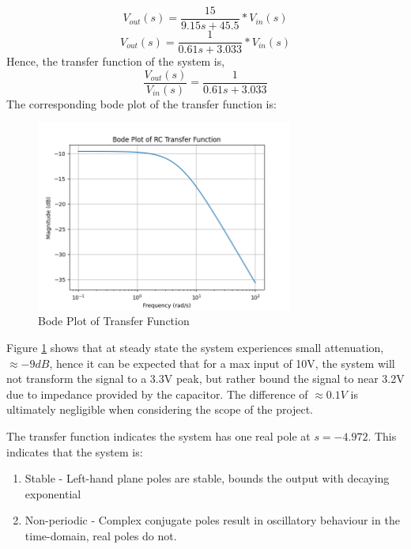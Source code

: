 \documentclass[12pt, a4paper]{article}
\begin{document}
\[V_{out}(s)=\frac{15}{9.15s+45.5}*V_{in}(s)\]
\[V_{out}(s)=\frac{1}{0.61s+3.033}*V_{in}(s)\]
\indent Hence, the transfer function of the system is,
\[\frac{V_{out}(s)}{V_{in}(s)}=\frac{1}{0.61s+3.033}\]
The corresponding bode plot of the transfer function is:
\begin{figure}[H]
    \centering
    \includegraphics[width=0.75\textwidth]{bodeplot}
    \caption{Bode Plot of Transfer Function}
    \label{fig:bode_plot}
\end{figure}
\noindent Figure \ref{fig:bode_plot} shows that at steady state the system experiences small attenuation, $\approx-9dB$,
hence it can be expected that for a max input of 10V, the system will not transform the signal to a 3.3V peak, but rather
bound the signal to near 3.2V due to impedance provided by the capacitor.
The difference of $\approx 0.1V$ is ultimately negligible when considering the scope of the project.

The transfer function indicates the system has one real pole at $s=-4.972$. This indicates that the system is:
\begin{enumerate}
    \item Stable - Left-hand plane poles are stable, bounds the output with decaying exponential
    \item Non-periodic - Complex conjugate poles result in oscillatory behaviour in the time-domain, real poles do not.
\end{enumerate}
\end{document}
